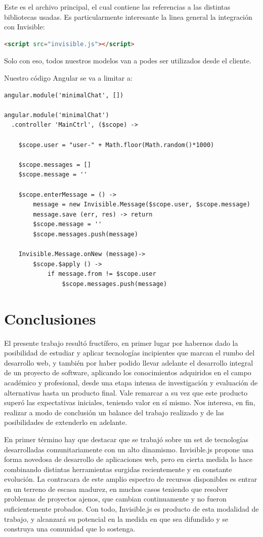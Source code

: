 \documentclass[doc,helv,longtable]{article}
\begin{document}
Este es el archivo principal, el cual contiene las referencias a las distintas bibliotecas usadas. Es particularmente interesante la linea general la integración con Invisible:

\begin{lstlisting}[language=html]
<script src="invisible.js"></script>
\end{lstlisting}

Solo con eso, todos nuestros modelos van a podes ser utilizados desde el cliente.

Nuestro código Angular se va a limitar a:

\begin{lstlisting}
angular.module('minimalChat', [])

angular.module('minimalChat')
  .controller 'MainCtrl', ($scope) ->

    $scope.user = "user-" + Math.floor(Math.random()*1000)

    $scope.messages = []
    $scope.message = ''

    $scope.enterMessage = () ->
        message = new Invisible.Message($scope.user, $scope.message)
        message.save (err, res) -> return
        $scope.message = ''
        $scope.messages.push(message)

    Invisible.Message.onNew (message)->
        $scope.$apply () ->
            if message.from != $scope.user
                $scope.messages.push(message)
\end{lstlisting}

\section{Conclusiones}
El presente trabajo resultó fructífero, en primer lugar por habernos dado la posibilidad de estudiar y aplicar tecnologías incipientes que marcan el rumbo del desarrollo web, y también por haber podido llevar adelante el desarrollo integral de un proyecto de software, aplicando los conocimientos adquiridos en el campo académico y profesional, desde una etapa intensa de investigación y evaluación de alternativas hasta un producto final. Vale remarcar a su vez que este producto superó las expectativas iniciales, teniendo valor en sí mismo. Nos interesa, en fin, realizar a modo de conclusión un balance del trabajo realizado y de las posibilidades de extenderlo en adelante.

En primer término hay que destacar que se trabajó sobre un set de tecnologías desarrolladas comunitariamente con un alto dinamismo. Invisible.js propone una forma novedosa de desarrollo de aplicaciones web, pero en cierta medida lo hace combinando distintas herramientas surgidas recientemente y en constante evolución. La contracara de este amplio espectro de recursos disponibles es entrar en un terreno de escasa madurez, en muchos casos teniendo que resolver problemas de proyectos ajenos, que cambian continuamente y no fueron suficientemente probados. Con todo, Invisible.js es producto de esta modalidad de trabajo, y alcanzará su potencial en la medida en que sea difundido y se construya una comunidad que lo sostenga.
\end{document}
